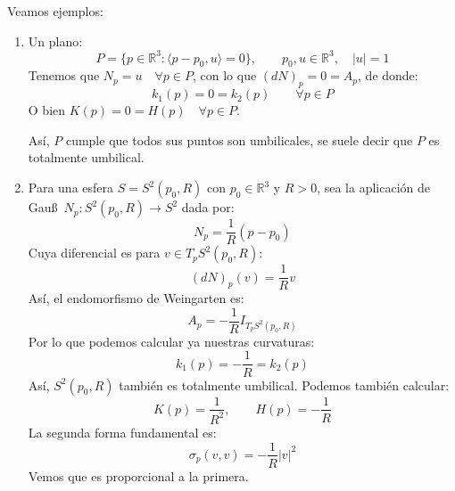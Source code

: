 \begin{ejemplo}
    Veamos ejemplos:
    \begin{enumerate}
        \item Un plano:
            \begin{equation*}
                P = \{p\in \mathbb{R}^3 : \langle p-p_0,u \rangle = 0\}, \qquad p_0,u\in \mathbb{R}^3, \quad |u| = 1
            \end{equation*}
            Tenemos que $N_p = u\quad \forall p\in P$, con lo que $(dN)_p = 0 = A_p$, de donde:
            \begin{equation*}
                k_1(p) = 0 = k_2(p) \qquad \forall p\in P
            \end{equation*}
            O bien $K(p) = 0 = H(p)\quad \forall p\in P$.

            Así, $P$ cumple que todos sus puntos son umbilicales, se suele decir que $P$ es totalmente umbilical.
        \item Para una esfera $S=S^2(p_0,R)$ con $p_0\in \mathbb{R}^3$ y $R>0$, sea la aplicación de Gau\ss\ $N_p:S^2(p_0,R)\to S^2$ dada por:
            \begin{equation*}
                N_p = \frac{1}{R}(p-p_0)
            \end{equation*}
            Cuya diferencial es para $v\in T_pS^2(p_0,R)$:
            \begin{equation*}
                (dN)_p(v) = \frac{1}{R}v
            \end{equation*}
            Así, el endomorfismo de Weingarten es:
            \begin{equation*}
                A_p = -\frac{1}{R}I_{T_pS^2(p_0,R)}
            \end{equation*}
            Por lo que podemos calcular ya nuestras curvaturas:
            \begin{equation*}
                k_1(p) = -\frac{1}{R} = k_2(p)
            \end{equation*}
            Así, $S^2(p_0,R)$ también es totalmente umbilical. Podemos también calcular:
            \begin{equation*}
                K(p) = \frac{1}{R^2}, \qquad H(p) = -\frac{1}{R}
            \end{equation*}
            La segunda forma fundamental es:
            \begin{equation*}
                \sigma_p(v,v) = -\frac{1}{R}|v|^2 
            \end{equation*}
            Vemos que es proporcional a la primera.

\end{enumerate}
\end{ejemplo}
